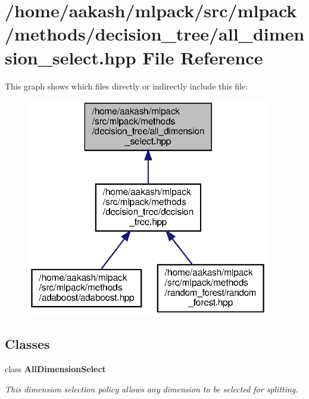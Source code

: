 \section{/home/aakash/mlpack/src/mlpack/methods/decision\+\_\+tree/all\+\_\+dimension\+\_\+select.hpp File Reference}
\label{all__dimension__select_8hpp}
This graph shows which files directly or indirectly include this file\+:
\nopagebreak
\begin{figure}[H]
\begin{center}
\leavevmode
\includegraphics[width=300pt]{all__dimension__select_8hpp__dep__incl}
\end{center}
\end{figure}
\subsection*{Classes}
\begin{DoxyCompactItemize}
\item 
class \textbf{ All\+Dimension\+Select}
\begin{DoxyCompactList}\small\item\em This dimension selection policy allows any dimension to be selected for splitting. \end{DoxyCompactList}\end{DoxyCompactItemize}
